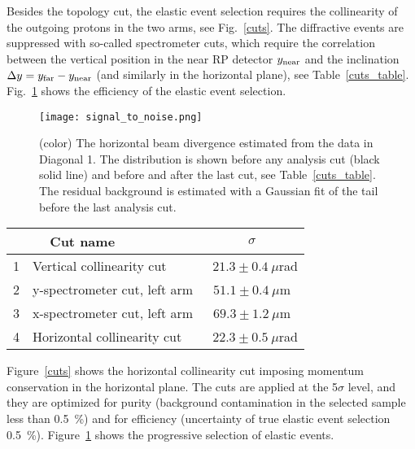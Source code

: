 \documentclass[TOTEM]{cernphprep}
\begin{document}
	Besides the topology cut, the elastic event selection requires the collinearity of the outgoing protons in the two arms, see Fig.~\ref{cuts}. The diffractive events are suppressed
	with so-called spectrometer cuts, which require the correlation between the vertical position in the near RP detector $y_{\rm near}$ and the inclination $\Delta y=y_{\rm far}-y_{\rm near}$ (and similarly in the horizontal plane), see Table~\ref{cuts_table}. Fig.~\ref{signal_to_noise} shows the efficiency of the elastic event selection.

	\begin{figure}[H]
		\centering
		\texttt{[image: signal\_to\_noise.png]}
		\caption{(color) The horizontal beam divergence estimated from the data in Diagonal 1. The distribution is shown before
		any analysis cut (black solid line) and before and after the last cut, see Table~\ref{cuts_table}. The residual background is estimated with a Gaussian fit of the tail before
		the last analysis cut. }
		\label{signal_to_noise}
	\end{figure}

	\begin{table*}\small\color{black}
        \begin{center}
            \caption{(color) The physics analysis cuts and their width $\sigma$ in Diagonal 1 (the other diagonal is in agreement within the quoted uncertainty). The width $\sigma$ of the horizontal and vertical collinearity cuts define the resolution in the scattering angle, see Figure~\ref{cuts}.}
            \begin{tabular}{ | c  l  c |}
		\hline
                		& \,\,\,\,\,\,\,\,Cut name	& 		$\sigma$		\\\hline 
			1	& Vertical collinearity cut	&  	 \,\,\,$21.3\pm0.4~\mu$rad		\\ 
			2	& y-spectrometer cut, left arm	& 	 $51.1\pm0.4~\mu$m		\\ 
			3	& x-spectrometer cut, left arm	& 	 $69.3\pm1.2~\mu$m		\\ 
			4	& Horizontal collinearity cut	& 	 \,\,\,$22.3\pm0.5~\mu$rad		\\\hline 
            \end{tabular}
        \label{cuts_table}
        \end{center}
    \end{table*}


	Figure~\ref{cuts} shows the horizontal collinearity cut imposing momentum conservation in the horizontal plane. The cuts are applied at the 5$\sigma$ level, and they are optimized for
	purity (background contamination in the selected sample	less than {0.5~\%)} and for efficiency (uncertainty of true elastic event selection 0.5~\%). Figure~\ref{signal_to_noise} shows the progressive selection
	of elastic events. 
\end{document}
